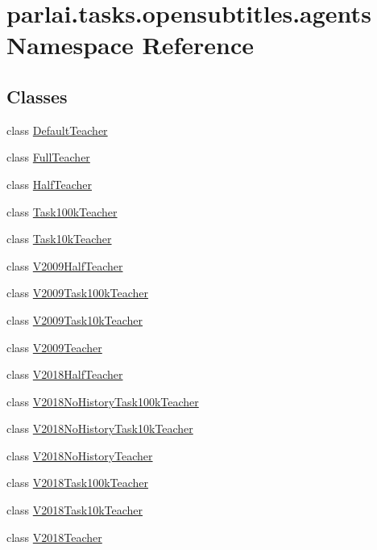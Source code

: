 \hypertarget{namespaceparlai_1_1tasks_1_1opensubtitles_1_1agents}{}\section{parlai.\+tasks.\+opensubtitles.\+agents Namespace Reference}
\label{namespaceparlai_1_1tasks_1_1opensubtitles_1_1agents}
\subsection*{Classes}
\begin{DoxyCompactItemize}
\item 
class \hyperlink{classparlai_1_1tasks_1_1opensubtitles_1_1agents_1_1DefaultTeacher}{Default\+Teacher}
\item 
class \hyperlink{classparlai_1_1tasks_1_1opensubtitles_1_1agents_1_1FullTeacher}{Full\+Teacher}
\item 
class \hyperlink{classparlai_1_1tasks_1_1opensubtitles_1_1agents_1_1HalfTeacher}{Half\+Teacher}
\item 
class \hyperlink{classparlai_1_1tasks_1_1opensubtitles_1_1agents_1_1Task100kTeacher}{Task100k\+Teacher}
\item 
class \hyperlink{classparlai_1_1tasks_1_1opensubtitles_1_1agents_1_1Task10kTeacher}{Task10k\+Teacher}
\item 
class \hyperlink{classparlai_1_1tasks_1_1opensubtitles_1_1agents_1_1V2009HalfTeacher}{V2009\+Half\+Teacher}
\item 
class \hyperlink{classparlai_1_1tasks_1_1opensubtitles_1_1agents_1_1V2009Task100kTeacher}{V2009\+Task100k\+Teacher}
\item 
class \hyperlink{classparlai_1_1tasks_1_1opensubtitles_1_1agents_1_1V2009Task10kTeacher}{V2009\+Task10k\+Teacher}
\item 
class \hyperlink{classparlai_1_1tasks_1_1opensubtitles_1_1agents_1_1V2009Teacher}{V2009\+Teacher}
\item 
class \hyperlink{classparlai_1_1tasks_1_1opensubtitles_1_1agents_1_1V2018HalfTeacher}{V2018\+Half\+Teacher}
\item 
class \hyperlink{classparlai_1_1tasks_1_1opensubtitles_1_1agents_1_1V2018NoHistoryTask100kTeacher}{V2018\+No\+History\+Task100k\+Teacher}
\item 
class \hyperlink{classparlai_1_1tasks_1_1opensubtitles_1_1agents_1_1V2018NoHistoryTask10kTeacher}{V2018\+No\+History\+Task10k\+Teacher}
\item 
class \hyperlink{classparlai_1_1tasks_1_1opensubtitles_1_1agents_1_1V2018NoHistoryTeacher}{V2018\+No\+History\+Teacher}
\item 
class \hyperlink{classparlai_1_1tasks_1_1opensubtitles_1_1agents_1_1V2018Task100kTeacher}{V2018\+Task100k\+Teacher}
\item 
class \hyperlink{classparlai_1_1tasks_1_1opensubtitles_1_1agents_1_1V2018Task10kTeacher}{V2018\+Task10k\+Teacher}
\item 
class \hyperlink{classparlai_1_1tasks_1_1opensubtitles_1_1agents_1_1V2018Teacher}{V2018\+Teacher}
\end{DoxyCompactItemize}
